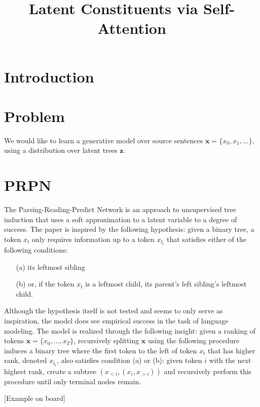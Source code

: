 \documentclass{article}
\title{Latent Constituents via Self-Attention}
\newcommand{\bx}{\mathbf{x}}
\newcommand{\bz}{\mathbf{z}}
\begin{document}
\maketitle

\section{Introduction}


\section{Problem}
We would like to learn a generative model
over source sentences $\bx = \{x_0, x_1, \ldots\}$,
using a distribution over latent trees $\bz$.  
\citep{shen2018prpn}
\citet{yin18structvae}

\section{PRPN \citep{shen2018prpn}}
The Parsing-Reading-Predict Network \citep{shen2018prpn} is an approach to unsupervised tree induction
that uses a soft approximation to a latent variable to a degree of success.
The paper is inspired by the following hypothesis:
given a binary tree, a token $x_t$ only requires information up to a token $x_{l_t}$ that satisfies
either of the following conditions:
\begin{itemize}
\item[(a)] its leftmost sibling
\item[(b)] or, if the token $x_t$ is a leftmost child, its parent's left sibling's leftmost child.
\end{itemize}
Although the hypothesis itself is not tested and seems to only serve as inspiration,
the model does see empirical success in the task of language modeling.
The model is realized through the following insight: given a ranking of tokens $\bx = \{x_0,\ldots,x_T\}$,
recursively splitting $\bx$ using the following procedure induces a binary tree where the first token to the left
of token $x_t$ that has higher rank, denoted $x_{l_t}$, also satisfies condition (a) or (b):
given token $i$ with the next highest rank, create a subtree $(x_{<i}, (x_i, x_{>i}))$ and
recursively perform this procedure until only terminal nodes remain.

[Example on board]
\end{document}
